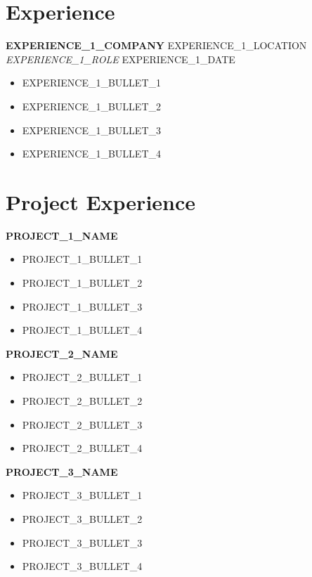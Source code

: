 \documentclass[a4paper,10pt]{article}
\begin{document}
\section{Experience}
\noindent \textbf{ {{EXPERIENCE_1_COMPANY}} } \hfill {{EXPERIENCE_1_LOCATION}} \\
\textit{ {{EXPERIENCE_1_ROLE}} } \hfill {{EXPERIENCE_1_DATE}}
\begin{itemize}
    \item {{EXPERIENCE_1_BULLET_1}}
    \item {{EXPERIENCE_1_BULLET_2}}
    \item {{EXPERIENCE_1_BULLET_3}}
    \item {{EXPERIENCE_1_BULLET_4}}
\end{itemize}

\section{Project Experience}

\noindent \textbf{ {{PROJECT_1_NAME}} }
\begin{itemize}
    \item {{PROJECT_1_BULLET_1}}
    \item {{PROJECT_1_BULLET_2}}
    \item {{PROJECT_1_BULLET_3}}
    \item {{PROJECT_1_BULLET_4}}
\end{itemize}

\vspace{5pt}

\noindent \textbf{ {{PROJECT_2_NAME}} }
\begin{itemize}
    \item {{PROJECT_2_BULLET_1}}
    \item {{PROJECT_2_BULLET_2}}
    \item {{PROJECT_2_BULLET_3}}
    \item {{PROJECT_2_BULLET_4}}
\end{itemize}

\vspace{5pt}

\noindent \textbf{ {{PROJECT_3_NAME}} }
\begin{itemize}
    \item {{PROJECT_3_BULLET_1}}
    \item {{PROJECT_3_BULLET_2}}
    \item {{PROJECT_3_BULLET_3}}
    \item {{PROJECT_3_BULLET_4}}
\end{itemize}
\end{document}
